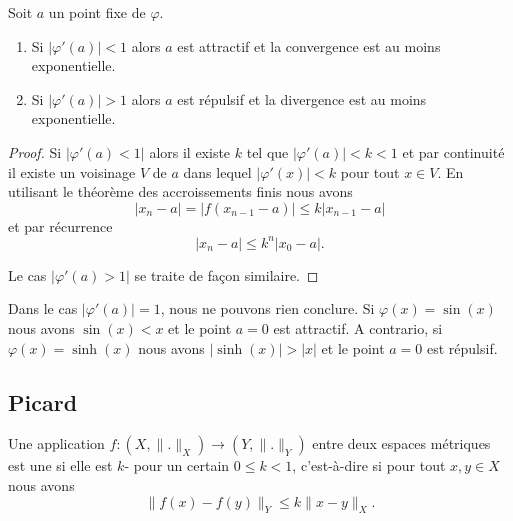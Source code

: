 \begin{lemma}
    Soit \( a\) un point fixe de \( \varphi\).
    \begin{enumerate}
        \item
    Si \( | \varphi'(a) |<1\) alors \( a\) est attractif et la convergence est au moins exponentielle.
\item
    Si \( | \varphi'(a) |>1\) alors \( a\) est répulsif et la divergence est au moins exponentielle.
    \end{enumerate}
\end{lemma}

\begin{proof}
    Si \( | \varphi'(a)<1 |\) alors il existe \( k\) tel que \( | \varphi'(a) |<k<1\) et par continuité il existe un voisinage \( V\) de \( a\) dans lequel \( | \varphi'(x) |<k\) pour tout \( x\in V\). En utilisant le théorème des accroissements finis nous avons
    \begin{equation}
        | x_n-a |=\big| f(x_{n-1}-a) \big|\leq k| x_{n-1}-a |
    \end{equation}
    et par récurrence
    \begin{equation}
        | x_n-a |\leq k^n| x_0-a |.
    \end{equation}

    Le cas \( | \varphi'(a)>1 |\) se traite de façon similaire.
\end{proof}

\begin{remark}
    Dans le cas \(| \varphi'(a) |=1\), nous ne pouvons rien conclure. Si \( \varphi(x)=\sin(x)\) nous avons \( \sin(x)<x\) et le point \( a=0\) est attractif. A contrario, si \( \varphi(x)=\sinh(x)\) nous avons \( |\sinh(x)|>|x|\) et le point \( a=0\) est répulsif.
\end{remark}

\subsection{Picard}

\begin{definition}      \label{DEFooRSLCooAsWisu}
    Une application \( f\colon (X,\| . \|_X)\to (Y,\| . \|_Y)\) entre deux espaces métriques est une  si elle est \( k\)- pour un certain \( 0\leq k<1\), c'est-à-dire si pour tout \( x,y\in X\) nous avons
    \begin{equation}
        \| f(x)-f(y) \|_Y\leq k\| x-y \|_{X}.
    \end{equation}
\end{definition}


